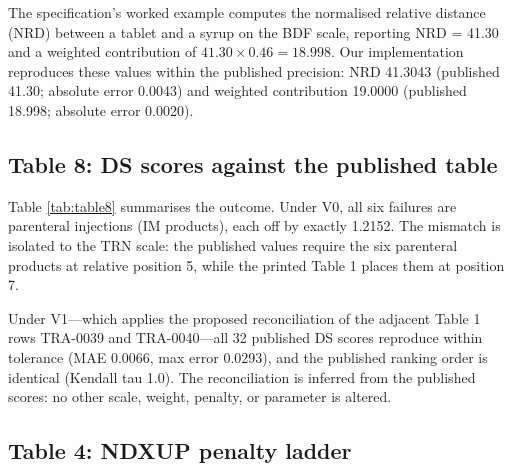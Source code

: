 \documentclass[12pt,twocolumn,a4paper]{elsarticle}
\begin{document}
The specification's worked example computes the normalised relative distance (NRD) between a tablet and a syrup on the BDF scale, reporting NRD = 41.30 and a weighted contribution of $41.30 \times 0.46 = 18.998$. Our implementation reproduces these values within the published precision: NRD 41.3043 (published 41.30; absolute error 0.0043) and weighted contribution 19.0000 (published 18.998; absolute error 0.0020).

\subsection{Table 8: DS scores against the published table}
\label{sec:results-table8}

\begin{table}[htbp]
\centering\small
\caption{Reproduction of the 32 published Table 8 DS scores under two scoring modes. Match tolerance: 0.05 (published one-decimal rounding).}
\label{tab:table8}
\end{table}

Table \ref{tab:table8} summarises the outcome. Under V0, all six failures are parenteral injections (IM products), each off by exactly 1.2152. The mismatch is isolated to the TRN scale: the published values require the six parenteral products at relative position 5, while the printed Table 1 places them at position 7.

Under V1---which applies the proposed reconciliation of the adjacent Table 1 rows TRA-0039 and TRA-0040---all 32 published DS scores reproduce within tolerance (MAE 0.0066, max error 0.0293), and the published ranking order is identical (Kendall tau 1.0). The reconciliation is inferred from the published scores: no other scale, weight, penalty, or parameter is altered.

\subsection{Table 4: NDXUP penalty ladder}
\label{sec:results-table4}
\end{document}
